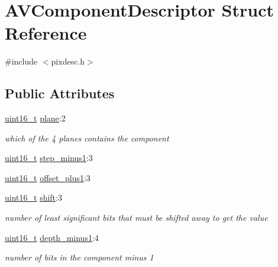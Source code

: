 \hypertarget{struct_a_v_component_descriptor}{}\section{A\+V\+Component\+Descriptor Struct Reference}
\label{struct_a_v_component_descriptor}


{\ttfamily \#include $<$pixdesc.\+h$>$}

\subsection*{Public Attributes}
\begin{DoxyCompactItemize}
\item 
\hyperlink{lib-src_2ffmpeg_2win32_2stdint_8h_a30af71eaf40c925c9832eb289a48da35}{uint16\+\_\+t} \hyperlink{struct_a_v_component_descriptor_af04062021a495e4e7281daf56d0dc5f2}{plane}\+:2
\begin{DoxyCompactList}\small\item\em which of the 4 planes contains the component \end{DoxyCompactList}\item 
\hyperlink{lib-src_2ffmpeg_2win32_2stdint_8h_a30af71eaf40c925c9832eb289a48da35}{uint16\+\_\+t} \hyperlink{struct_a_v_component_descriptor_ac1e0fdc2d6f0e4968ab2dbfde2e931fd}{step\+\_\+minus1}\+:3
\item 
\hyperlink{lib-src_2ffmpeg_2win32_2stdint_8h_a30af71eaf40c925c9832eb289a48da35}{uint16\+\_\+t} \hyperlink{struct_a_v_component_descriptor_ad6df400869e3f23db136d4cdccd09ba9}{offset\+\_\+plus1}\+:3
\item 
\hyperlink{lib-src_2ffmpeg_2win32_2stdint_8h_a30af71eaf40c925c9832eb289a48da35}{uint16\+\_\+t} \hyperlink{struct_a_v_component_descriptor_ad487b67c4c15c59f2963f1454e41861c}{shift}\+:3
\begin{DoxyCompactList}\small\item\em number of least significant bits that must be shifted away to get the value \end{DoxyCompactList}\item 
\hyperlink{lib-src_2ffmpeg_2win32_2stdint_8h_a30af71eaf40c925c9832eb289a48da35}{uint16\+\_\+t} \hyperlink{struct_a_v_component_descriptor_adfa5d36597fa267a289df19f5b342810}{depth\+\_\+minus1}\+:4
\begin{DoxyCompactList}\small\item\em number of bits in the component minus 1 \end{DoxyCompactList}\end{DoxyCompactItemize}



